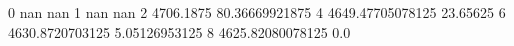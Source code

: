0 nan nan
1 nan nan
2 4706.1875 80.36669921875
4 4649.47705078125 23.65625
6 4630.8720703125 5.05126953125
8 4625.82080078125 0.0
